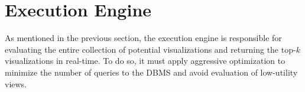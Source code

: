
\section{{\large \SeeDB} Execution Engine}
\label{sec:optimizer}

As mentioned in the previous section, the \SeeDB execution engine is responsible for
evaluating the entire collection of potential visualizations and returning the top-$k$
visualizations in real-time.
To do so, it must apply aggressive optimization to minimize the number of queries to the
DBMS and avoid evaluation of low-utility views.



